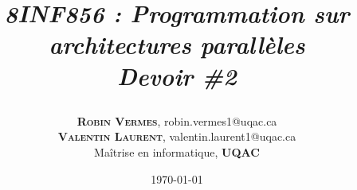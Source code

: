 \makeatletter
\renewcommand\@biblabel[1]{\textbf{#1.}} %
\renewcommand{\@listI}{\itemsep=0pt} %

\renewcommand{\maketitle}{ %
    \begin{flushright} %
    {\LARGE\@title} %

    \vspace{50pt} %

    {\large\@author} %
    \\\@date %

\vspace{40pt} %
\end{flushright}
}

\title{\begin{center}
\textit{8INF856 : Programmation sur architectures parallèles}\\ 
\textbf{\textit{Devoir \#2}}
\end{center}} %

\author{\textbf{\textsc{Robin Vermes}}, robin.vermes1@uqac.ca\\
	\textbf{\textsc{Valentin Laurent}}, valentin.laurent1@uqac.ca \\ %
	Maîtrise en informatique, \textbf{UQAC}} %

\date{\today} %